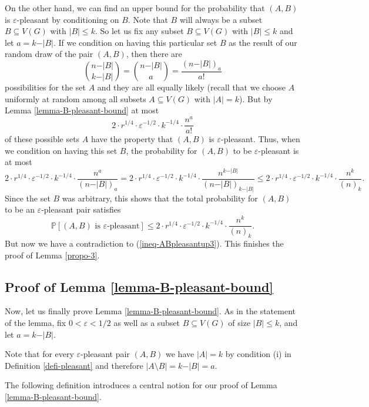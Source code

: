 \documentclass[11pt]{article}
\theoremstyle{definition}
\numberwithin{equation}{section}
\begin{document}
On the other hand, we can find an upper bound for the probability that $(A,B)$ is $\varepsilon$-pleasant by conditioning on $B$. Note that $B$ will always be a subset $B\subseteq V(G)$ with $\vert B\vert \leq k$. So let us fix any subset $B\subseteq V(G)$ with $\vert B\vert \leq k$ and let $a=k-\vert B\vert$. If we condition on having this particular set $B$ as the result of our random draw of the pair $(A,B)$, then there are
\[{n-\vert B\vert\choose k-\vert B\vert}={n-\vert B\vert\choose a}=\frac{(n-\vert B\vert)_a}{a!}\]
possibilities for the set $A$ and they are all equally likely (recall that we choose $A$ uniformly at random among all subsets $A\subseteq V(G)$ with $\vert A\vert=k$). But by Lemma \ref{lemma-B-pleasant-bound} at most
\[2\cdot r^{1/4}\cdot \varepsilon^{-1/2}\cdot k^{-1/4}\cdot \frac{n^a}{a!}\]
of these possible sets $A$ have the property that $(A,B)$ is $\varepsilon$-pleasant. Thus, when we condition on having this set $B$, the probability for $(A,B)$ to be $\varepsilon$-pleasant  is at most
\[2\cdot r^{1/4}\cdot \varepsilon^{-1/2}\cdot k^{-1/4}\cdot \frac{n^a}{(n-\vert B\vert)_a}=
2\cdot r^{1/4}\cdot \varepsilon^{-1/2}\cdot k^{-1/4}\cdot \frac{n^{k-\vert B\vert}}{(n-\vert B\vert)_{k-\vert B\vert}}
\leq 2\cdot r^{1/4}\cdot \varepsilon^{-1/2}\cdot k^{-1/4}\cdot \frac{n^k}{(n)_k}.\]
Since the set $B$ was arbitrary, this shows that the total probability for $(A,B)$ to be an $\varepsilon$-pleasant pair satisfies
\[\mathbb{P}[(A,B)\text{ is }\varepsilon\text{-pleasant}]\leq 2\cdot r^{1/4}\cdot \varepsilon^{-1/2}\cdot k^{-1/4}\cdot \frac{n^k}{(n)_k}.\]
But now we have a contradiction to (\ref{ineq-ABpleasantup3}). This finishes the proof of Lemma \ref{propo-3}.

\subsection{Proof of Lemma \ref{lemma-B-pleasant-bound}}

Now, let us finally prove Lemma \ref{lemma-B-pleasant-bound}. As in the statement of the lemma, fix $0<\varepsilon<1/2$ as well as a subset $B\subseteq V(G)$ of size $\vert B\vert\leq k$, and let $a=k-\vert B\vert$.

Note that for every $\varepsilon$-pleasant pair $(A,B)$ we have $\vert A\vert=k$ by condition (i) in Definition \ref{defi-pleasant} and therefore $\vert A\setminus B\vert=k-\vert B\vert=a$.

The following definition introduces a central notion for our proof of Lemma \ref{lemma-B-pleasant-bound}.
\end{document}
